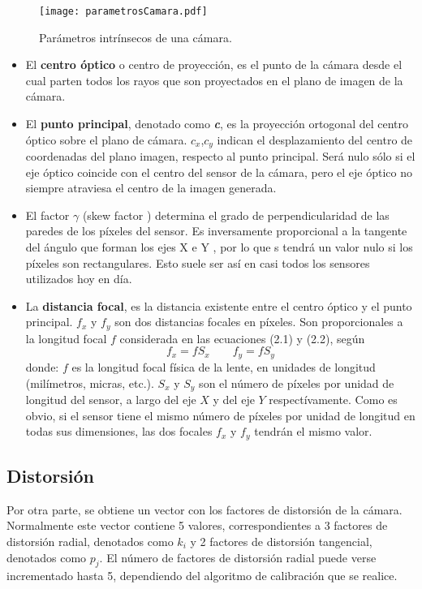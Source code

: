 \begin{figure}[h!]
  \centering
  \texttt{[image: parametrosCamara.pdf]}
  \caption{Parámetros intrínsecos de una cámara.}
  \label{fig:FIGparamCam}
\end{figure}

\begin{itemize}
\item El \textbf{centro óptico} o centro de proyección, es el punto de la cámara desde el cual parten todos los rayos que son proyectados en el plano de imagen de la cámara.

\item El \textbf{punto principal}, denotado como \textbf{\textit{c}}, es la proyección ortogonal del centro óptico sobre el plano de cámara.  $c_x$,$c_y$ indican el desplazamiento del centro de coordenadas del plano imagen, respecto al punto principal. Será nulo sólo si el eje óptico coincide con el centro del sensor de la cámara, pero el eje óptico no siempre atraviesa el centro de la imagen generada. 

\item El factor $\gamma$ (skew factor ) determina el grado de perpendicularidad de las paredes de los píxeles del sensor. Es inversamente proporcional a la tangente del ángulo que forman los ejes X e Y , por lo que s tendrá un valor nulo si los píxeles son rectangulares. Esto suele ser así en casi todos los sensores utilizados hoy en día. 

\item La \textbf{distancia focal}, es la distancia existente entre el centro óptico y el punto principal. $f_x$ y $f_y$ son dos distancias focales en píxeles. Son proporcionales a la longitud focal $f$ considerada en las ecuaciones (2.1) y (2.2), según 
\begin{equation}
f_x = f S_x \quad \quad f_y = f S_y
\end{equation}
donde: $f$ es la longitud focal física de la lente, en unidades de longitud (milímetros, micras, etc.). $S_x$ y $S_y$ son el número de píxeles por unidad de longitud del sensor, a largo del eje $X$ y del eje $Y$ respectívamente. Como es obvio, si el sensor tiene el mismo número de píxeles por unidad de longitud en todas sus dimensiones, las dos focales $f_x$ y $f_y$ tendrán el mismo valor.
\end{itemize}

\subsection{Distorsión}
Por otra parte, se obtiene un vector con los factores de distorsión de la cámara. Normalmente este vector contiene 5 valores, correspondientes a 3 factores de distorsión radial, denotados como $k_{i}$ y 2 factores de distorsión tangencial, denotados como $p_{j}$. El número de factores de distorsión radial puede verse incrementado hasta 5, dependiendo del algoritmo de calibración que se realice.

